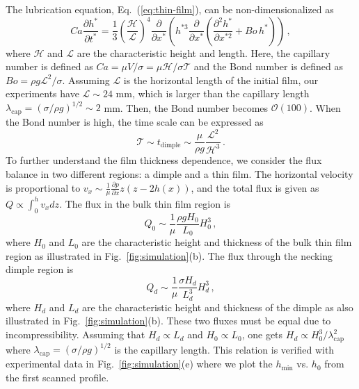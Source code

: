 \documentclass[aps,prfluids,amsmath,amssymb,superscriptaddress,longbibliography]{revtex4-2}
\newif\ifhighlight
\newcommand{\hl}[1]{\ifhighlight\textcolor{blue}{#1}\else#1\fi}
\begin{document}
\hl{The lubrication equation, Eq.~(\ref{eq:thin-film}), can be non-dimensionalized as 
\begin{equation}
        Ca \frac{\partial h^*}{\partial t^*} = \frac{1}{3} \left(\frac{\mathcal{H}}{\mathcal{L}}\right)^4 \frac{\partial}{\partial x^*} \left( h^{*3} \frac{\partial }{\partial x^*} \left( \frac{\partial^2 h^*}{\partial x^{*2}} + Bo \, {h^*} \right) \right) \, ,        
\end{equation}
where $\mathcal{H}$ and $\mathcal{L}$ are the characteristic height and length. Here, the capillary number is defined as $Ca = \mu V/\sigma = \mu \mathcal{H}/\sigma \mathcal{T}$ and the Bond number is defined as $Bo = \rho g \mathcal{L}^2 /\sigma$. Assuming $\mathcal{L}$ is the horizontal length of the initial film, our experiments have $\mathcal{L} \sim 24$ mm, which is larger than the capillary length $\lambda_\mathrm{cap} = (\sigma/\rho g)^{1/2}\sim 2$ mm. Then, the Bond number becomes $\mathcal{O} (100)$. 
When the Bond number is high, the time scale can be expressed as 
\begin{equation}
    \mathcal{T} \sim t_{\mathrm{dimple}} \sim \frac{\mu}{\rho g} \frac{\mathcal{L}^2}{\mathcal{H}^3} \label{eq:lub_time} \,.
\end{equation}
To further understand the film thickness dependence, we consider the flux balance in two different regions: a dimple and a thin film. The horizontal velocity is proportional to $ v_x \sim \frac{1}{\mu} \frac{\partial p}{\partial x} z (z- 2h(x))$, and the total flux is given as $Q \propto \int_0^h v_x dz$. The flux in the bulk thin film region is 
\begin{equation}
    Q_0 \sim \frac{1}{\mu} \frac{\rho g H_0}{L_0} {H_0^3} \,, 
\end{equation}
where $H_0$ and $L_0$ are the characteristic height and thickness of the bulk thin film region as illustrated in Fig.~\ref{fig:simulation}(b). 
The flux through the necking dimple region is
\begin{equation}
    Q_d \sim \frac{1}{\mu} \frac{\sigma H_d}{L_d^3} {H_d^3} \,,
\end{equation}
where $H_d$ and $L_d$ are the characteristic height and thickness of the dimple as also illustrated in Fig.~\ref{fig:simulation}(b). 
These two fluxes must be equal due to incompressibility. 
Assuming that $H_d \propto L_d$ and $H_0 \propto L_0$, one gets 
$H_d \propto H_0^3/\lambda_\mathrm{cap}^2$ where $\lambda_\mathrm{cap} = (\sigma/\rho g)^{1/2}$ is the capillary length. This relation is verified with experimental data in Fig.~\ref{fig:simulation}(e) where we plot the $h_\mathrm{min}$ vs. $h_0$ from the first scanned profile. }
\end{document}
